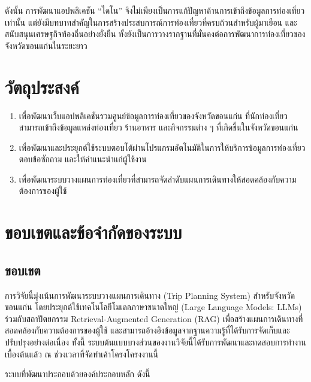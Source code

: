 ดังนั้น การพัฒนาแอปพลิเคชัน ``ไดโน'' จึงไม่เพียงเป็นการแก้ปัญหาด้านการเข้าถึงข้อมูลการท่องเที่ยวเท่านั้น แต่ยังมีบทบาทสำคัญในการสร้างประสบการณ์การท่องเที่ยวที่ครบถ้วนสำหรับผู้มาเยือน และสนับสนุนเศรษฐกิจท้องถิ่นอย่างยั่งยืน ทั้งยังเป็นการวางรากฐานที่มั่นคงต่อการพัฒนาการท่องเที่ยวของจังหวัดขอนแก่นในระยะยาว

\section{วัตถุประสงค์}

\begin{enumerate}
    \item เพื่อพัฒนาเว็บแอปพลิเคชันรวมศูนย์ข้อมูลการท่องเที่ยวของจังหวัดขอนแก่น ที่นักท่องเที่ยวสามารถเข้าถึงข้อมูลแหล่งท่องเที่ยว ร้านอาหาร และกิจกรรมต่าง ๆ ที่เกิดขึ้นในจังหวัดขอนแก่น
    \item เพื่อพัฒนาและประยุกต์ใช้ระบบตอบโต้ผ่านโปรแกรมอัตโนมัติในการให้บริการข้อมูลการท่องเที่ยว ตอบข้อซักถาม และให้คำแนะนำแก่ผู้ใช้งาน
    \item เพื่อพัฒนาระบบวางแผนการท่องเที่ยวที่สามารถจัดลำดับแผนการเดินทางให้สอดคล้องกับความต้องการของผู้ใช้
\end{enumerate}

\section{ขอบเขตและข้อจำกัดของระบบ}

\subsection{ขอบเขต}

การวิจัยนี้มุ่งเน้นการพัฒนาระบบวางแผนการเดินทาง (Trip Planning System) สำหรับจังหวัดขอนแก่น โดยประยุกต์ใช้เทคโนโลยีโมเดลภาษาขนาดใหญ่ (Large Language Models: LLMs) ร่วมกับสถาปัตยกรรม Retrieval-Augmented Generation (RAG) เพื่อสร้างแผนการเดินทางที่สอดคล้องกับความต้องการของผู้ใช้ และสามารถอ้างอิงข้อมูลจากฐานความรู้ที่ได้รับการจัดเก็บและปรับปรุงอย่างต่อเนื่อง ทั้งนี้ ระบบต้นแบบบางส่วนของงานวิจัยนี้ได้รับการพัฒนาและทดสอบการทำงานเบื้องต้นแล้ว ณ ช่วงเวลาที่จัดทำเค้าโครงโครงงานนี้

ระบบที่พัฒนาประกอบด้วยองค์ประกอบหลัก ดังนี้

